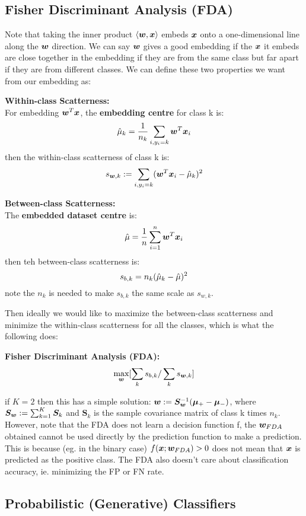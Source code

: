 \subsection{Fisher Discriminant Analysis (FDA)}
Note that taking the inner product $\langle \bm{w}, \bm{x} \rangle$ embeds $\bm{x}$ onto a one-dimensional line along the $\bm{w}$ direction. We can say $\bm{w}$ gives a good embedding if the $\bm{x}$ it embeds are close together in the embedding if they are from the same class but far apart if they are from different classes. We can define these two properties we want from our embedding as:
\begin{definition}
    \textbf{Within-class Scatterness:} \\
    For embedding $\bm{w}^{T} \bm{x}$, the \textbf{embedding centre} for class k is:
    \begin{equation}
        \hat{\mu}_{k} = \frac{1}{n_{k}} \sum_{i, y_{i}=k} \bm{w}^{T} \bm{x}_{i}
    \end{equation}
    then the within-class scatterness of class k is:
    \begin{equation}
        s_{\bm{w},k} := \sum_{i,y_{i}=k} (\bm{w}^{T} \bm{x}_{i} - \hat{\mu}_{k})^{2}
    \end{equation}
\end{definition}
\begin{definition}
    \textbf{Between-class Scatterness:} \\
    The \textbf{embedded dataset centre} is:
    \begin{equation}
        \hat{\mu} = \frac{1}{n} \sum_{i=1}^{n} \bm{w}^{T} \bm{x}_{i}
    \end{equation}
    then teh between-class scatterness is:
    \begin{equation}
        s_{b,k} = n_{k} (\hat{\mu}_{k} - \hat{\mu})^{2}
    \end{equation}
    note the $n_{k}$ is needed to make $s_{b,k}$ the same scale as $s_{w,k}$.
\end{definition}
Then ideally we would like to maximize the between-class scatterness and minimize the within-class scatterness for all the classes, which is what the following does:
\begin{definition}
    \textbf{Fisher Discriminant Analysis (FDA):} \\
    \begin{equation}
        \max_{\bm{w}} [\sum_{k} s_{b,k} / \sum_{k} s_{\bm{w},k} ]
    \end{equation}
\end{definition}
if $K=2$ then this has a simple solution: $\bm{w} := \bm{S}_{\bm{w}}^{-1} (\bm{\mu}_{+} - \bm{\mu}_{-})$, where $\bm{S}_{\bm{w}} := \sum_{k=1}^{K} \bm{S}_{k}$ and $\bm{S}_{k}$ is the sample covariance matrix of class k times $n_{k}$. However, note that the FDA does not learn a decision function f, the $\bm{w}_{FDA}$ obtained cannot be used directly by the prediction function to make a prediction. This is because (eg. in the binary case) $f(\bm{x};\bm{w}_{FDA})>0$ does not mean that $\bm{x}$ is predicted as the positive class. The FDA also doesn't care about classification accuracy, ie. minimizing the FP or FN rate.

\subsection{Probabilistic (Generative) Classifiers}
